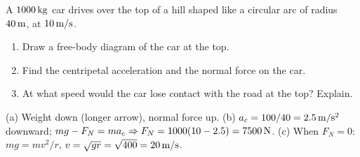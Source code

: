 \begin{exo}{}
A $1000\,\mathrm{kg}$ car drives over the top of a hill shaped like a circular arc of radius $40\,\mathrm{m}$, at $10\,\mathrm{m/s}$.
\begin{enumerate}[label=(\alph*)]
\item Draw a free-body diagram of the car at the top.
\item Find the centripetal acceleration and the normal force on the car.
\item At what speed would the car lose contact with the road at the top? Explain.
\end{enumerate}
\work{5cm}
\begin{solution}
(a) Weight down (longer arrow), normal force up. \;(b) $a_c=100/40=2.5\,\mathrm{m/s^2}$ downward; $mg-F_N=ma_c\Rightarrow F_N=1000(10-2.5)=7500\,\mathrm{N}$. \;(c) When $F_N=0$: $mg=mv^2/r$, $v=\sqrt{gr}=\sqrt{400}=20\,\mathrm{m/s}$.
\end{solution}
\end{exo}

